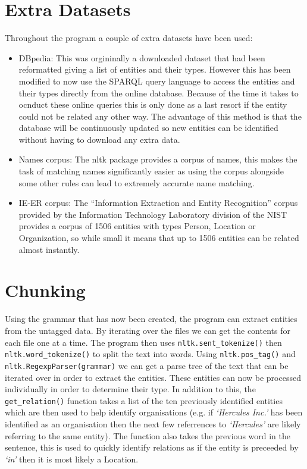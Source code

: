 \documentclass[draft]{article}
\begin{document}
\begin{multicols*}{2}
\section*{Extra Datasets}
Throughout the program a couple of extra datasets have been used:
\begin{itemize}
\item DBpedia: This was orgininally a downloaded dataset that had been reformatted giving a list of entities and their types. However this has been modified to now use the SPARQL query language to access the entities and their types directly from the online database. Because of the time it takes to ocnduct these online queries this is only done as a last resort if the entity could not be related any other way. The advantage of this method is that the database will be continuously updated so new entities can be identified without having to download any extra data.
\item Names corpus: The nltk package provides a corpus of names, this makes the task of matching names significantly easier as using the corpus alongside some other rules can lead to extremely accurate name matching.
\item IE-ER corpus: The ``Information Extraction and Entity Recognition'' corpus provided by the Information Technology Laboratory division of the NIST provides a corpus of 1506 entities with types Person, Location or Organization, so while small it means that up to 1506 entities can be related almost instantly.
\end{itemize}

\section*{Chunking}
Using the grammar that has now been created, the program can extract entities from the untagged data. By iterating over the files we can get the contents for each file one at a time. The program then uses \texttt{nltk.sent\_tokenize()} then \texttt{nltk.word\_tokenize()} to split the text into words. Using \texttt{nltk.pos\_tag()} and \texttt{nltk.RegexpParser(grammar)} we can get a parse tree of the text that can be iterated over in order to extract the entities. These entities can now be processed individually in order to determine their type. In addition to this, the \texttt{get\_relation()} function takes a list of the ten previously identified entities which are then used to help identify organisations (e.g. if \textit{`Hercules Inc.'} has been identified as an organisation then the next few referrences to \textit{`Hercules'} are likely referring to the same entity). The function also takes the previous word in the sentence, this is used to quickly identify relations as if the entity is preceeded by \textit{`in'} then it is most likely a Location.


\end{multicols*}
\end{document}
